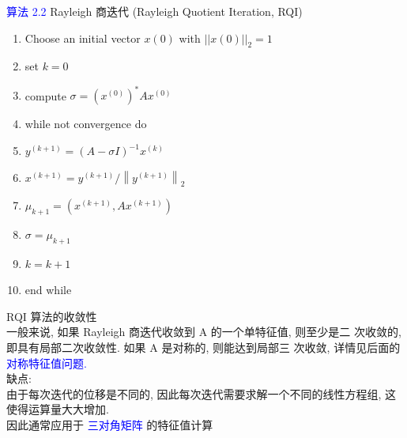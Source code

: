\documentclass[12pt,a4paper]{article}
\begin{document}
\textcolor{blue}{算法 2.2} Rayleigh 商迭代 (Rayleigh Quotient Iteration, RQI)\\
\begin{enumerate}
	\item Choose an initial vector $x(0)$ with $||x(0)||_{2} = 1$
	\item set $k=0$
	\item compute $\sigma=\left(x^{(0)}\right)^{*} A x^{(0)}$
	\item while not convergence do
	\item \qquad$y^{(k+1)} = (A-\sigma I)^{-1}x^{(k)}$
	\item \qquad$x^{(k+1)}=y^{(k+1)} /\left\|y^{(k+1)}\right\|_{2}$
	\item \qquad$\mu_{k+1}=\left(x^{(k+1)}, A x^{(k+1)}\right)$
	\item \qquad$\sigma=\mu_{k+1}$
	\item \qquad$k=k+1$
	\item end while
\end{enumerate}
RQI 算法的收敛性\\

一般来说, 如果 Rayleigh 商迭代收敛到 A 的一个单特征值, 则至少是二 次收敛的, 即具有局部二次收敛性. 如果 A 是对称的, 则能达到局部三 次收敛, 详情见后面的\textcolor{blue}{对称特征值问题.}\\

缺点:\\
由于每次迭代的位移是不同的, 因此每次迭代需要求解一个不同的线性方程组, 这使得运算量大大增加. \\
因此通常应用于 \textcolor{blue}{三对角矩阵} 的特征值计算
\end{document}
